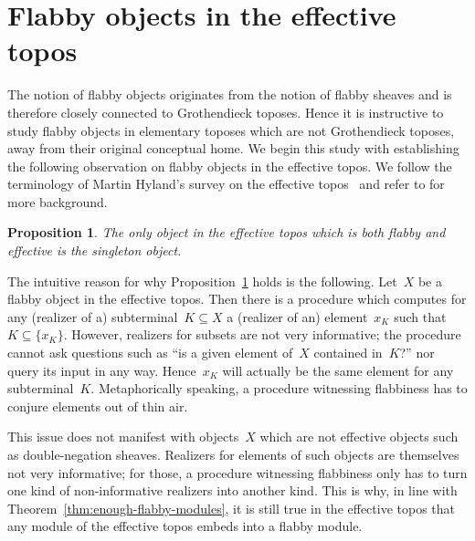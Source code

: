 \documentclass[oneside]{amsart}
\theoremstyle{definition}
\theoremstyle{plain}
\newtheorem{prop}[defn]{Proposition}
\theoremstyle{remark}
\renewcommand{\_}{\mathpunct{.}\,}
\newcommand{\effective}{ef{}fective\xspace}
\begin{document}
\section{Flabby objects in the \effective topos}
\label{sect:in-eff}

The notion of flabby objects originates from the notion of flabby sheaves and is
therefore closely connected to Grothendieck toposes. Hence it is instructive
to study flabby objects in elementary toposes which are not Grothendieck
toposes, away from their original conceptual home. We begin this study with
establishing the following observation on flabby objects in the \effective
topos. We follow the terminology of Martin Hyland's survey on the \effective
topos~\cite{hyland:effective-topos} and refer to
\cite{oosten:realizability,moerdijk-oosten:topos-theory,phoa:effective,bauer:c2c} for more background.

\begin{prop}\label{prop:flabby-effective-sets}
The only object in the \effective topos which is both flabby and \effective is the
singleton object.
\end{prop}


The intuitive
reason for why Proposition~\ref{prop:flabby-effective-sets} holds is the
following. Let~$X$ be a flabby object in the \effective topos. Then there is a
procedure which computes for any (realizer of a) subterminal~$K \subseteq X$ a
(realizer of an) element~$x_K$
such that~$K \subseteq \{ x_K \}$. However, realizers for subsets are not very
informative; the procedure cannot ask questions such as ``is a
given element of~$X$ contained in~$K$?'' nor query its input in any way.
Hence~$x_K$ will actually be the same element for any subterminal~$K$.
Metaphorically speaking, a procedure witnessing flabbiness has to
conjure elements out of thin air.

This issue does not manifest with objects~$X$ which are not \effective objects
such as double-negation sheaves. Realizers for elements of such objects are
themselves not very informative; for those, a procedure witnessing flabbiness
only has to turn one kind of non-informative realizers into another kind. This
is why, in line with Theorem~\ref{thm:enough-flabby-modules}, it is still true
in the \effective topos that any module of the \effective topos embeds into a
flabby module.
\end{document}
